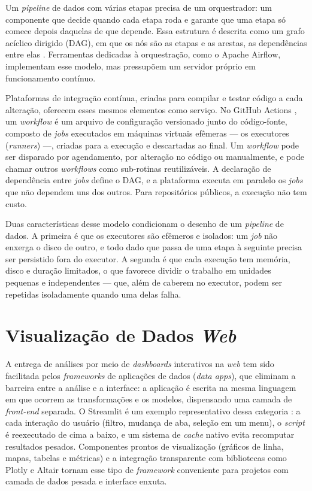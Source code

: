 Um \textit{pipeline} de dados com várias etapas precisa de um orquestrador: um componente que decide quando cada etapa roda e garante que uma etapa só comece depois daquelas de que depende. Essa estrutura é descrita como um grafo acíclico dirigido (DAG), em que os nós são as etapas e as arestas, as dependências entre elas \cite{Reis2022}. Ferramentas dedicadas à orquestração, como o Apache Airflow, implementam esse modelo, mas pressupõem um servidor próprio em funcionamento contínuo.

Plataformas de integração contínua, criadas para compilar e testar código a cada alteração, oferecem esses mesmos elementos como serviço. No GitHub Actions \cite{GitHubActions2026}, um \textit{workflow} é um arquivo de configuração versionado junto do código-fonte, composto de \textit{jobs} executados em máquinas virtuais efêmeras --- os executores (\textit{runners}) ---, criadas para a execução e descartadas ao final. Um \textit{workflow} pode ser disparado por agendamento, por alteração no código ou manualmente, e pode chamar outros \textit{workflows} como sub-rotinas reutilizáveis. A declaração de dependência entre \textit{jobs} define o DAG, e a plataforma executa em paralelo os \textit{jobs} que não dependem uns dos outros. Para repositórios públicos, a execução não tem custo.

Duas características desse modelo condicionam o desenho de um \textit{pipeline} de dados. A primeira é que os executores são efêmeros e isolados: um \textit{job} não enxerga o disco de outro, e todo dado que passa de uma etapa à seguinte precisa ser persistido fora do executor. A segunda é que cada execução tem memória, disco e duração limitados, o que favorece dividir o trabalho em unidades pequenas e independentes --- que, além de caberem no executor, podem ser repetidas isoladamente quando uma delas falha.


\section{Visualização de Dados \textit{Web}}

A entrega de análises por meio de \textit{dashboards} interativos na \textit{web} tem sido facilitada pelos \textit{frameworks} de aplicações de dados (\textit{data apps}), que eliminam a barreira entre a análise e a interface: a aplicação é escrita na mesma linguagem em que ocorrem as transformações e os modelos, dispensando uma camada de \textit{front-end} separada. O Streamlit é um exemplo representativo dessa categoria \cite{Streamlit2024}: a cada interação do usuário (filtro, mudança de aba, seleção em um menu), o \textit{script} é reexecutado de cima a baixo, e um sistema de \textit{cache} nativo evita recomputar resultados pesados. Componentes prontos de visualização (gráficos de linha, mapas, tabelas e métricas) e a integração transparente com bibliotecas como Plotly e Altair tornam esse tipo de \textit{framework} conveniente para projetos com camada de dados pesada e interface enxuta.


